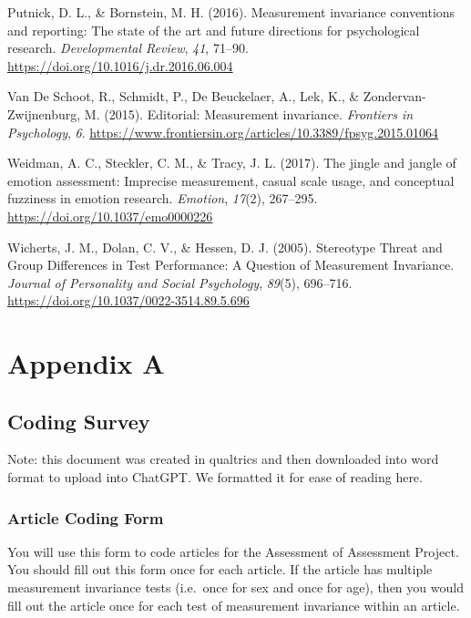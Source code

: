 \documentclass[
  man]{apa7}
\newlength{\cslhangindent}
\newenvironment{CSLReferences}[2] %
 {\begin{list}{}{%
  \setlength{\itemindent}{0pt}
  \setlength{\leftmargin}{0pt}
  \setlength{\parsep}{0pt}
  \ifodd #1
   \setlength{\leftmargin}{\cslhangindent}
   \setlength{\itemindent}{-1\cslhangindent}
  \fi
  \setlength{\itemsep}{#2\baselineskip}}}
 {\end{list}}
\begin{document}
\begin{CSLReferences}{1}{0}
Putnick, D. L., \& Bornstein, M. H. (2016). Measurement invariance conventions and reporting: The state of the art and future directions for psychological research. \emph{Developmental Review}, \emph{41}, 71--90. \url{https://doi.org/10.1016/j.dr.2016.06.004}

Van De Schoot, R., Schmidt, P., De Beuckelaer, A., Lek, K., \& Zondervan-Zwijnenburg, M. (2015). Editorial: Measurement invariance. \emph{Frontiers in Psychology}, \emph{6}. \url{https://www.frontiersin.org/articles/10.3389/fpsyg.2015.01064}

Weidman, A. C., Steckler, C. M., \& Tracy, J. L. (2017). The jingle and jangle of emotion assessment: Imprecise measurement, casual scale usage, and conceptual fuzziness in emotion research. \emph{Emotion}, \emph{17}(2), 267--295. \url{https://doi.org/10.1037/emo0000226}

Wicherts, J. M., Dolan, C. V., \& Hessen, D. J. (2005). Stereotype Threat and Group Differences in Test Performance: A Question of Measurement Invariance. \emph{Journal of Personality and Social Psychology}, \emph{89}(5), 696--716. \url{https://doi.org/10.1037/0022-3514.89.5.696}

\end{CSLReferences}

\newpage

\appendix


\section{Appendix A}\label{appendix-a}

\subsection{Coding Survey}\label{coding-survey}

Note: this document was created in qualtrics and then downloaded into word format to upload into ChatGPT. We formatted it for ease of reading here.

\subsubsection{Article Coding Form}\label{article-coding-form}

You will use this form to code articles for the Assessment of Assessment Project. You should fill out this form once for each article. If the article has multiple measurement invariance tests (i.e.~once for sex and once for age), then you would fill out the article once for each test of measurement invariance within an article.
\end{document}

